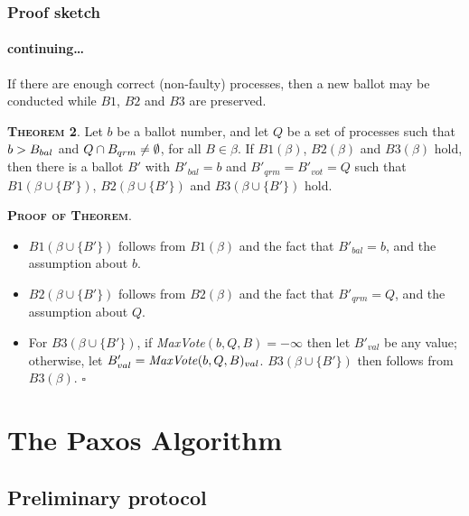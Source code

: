 \documentclass[10 pt]{beamer}
\begin{document}
\begin{frame}
\frametitle{Proof sketch}
\framesubtitle{continuing\ldots}

If there are enough correct (non-faulty) processes, then a new ballot may be conducted while $B1$, $B2$ and $B3$ are preserved.

\vspace{2 mm}
\textbf{\textsc{Theorem 2}}. Let $b$ be a ballot number, and let $Q$ be a set of processes such that $b > B_{bal}$ and $Q \cap B_{qrm} \neq \emptyset$, for all $B \in \beta$. If $B1(\beta)$, $B2(\beta)$ and $B3(\beta)$ hold, then there is a ballot $B'$ with $B'_{bal} = b$ and $B'_{qrm} = B'_{vot} = Q$ such that $B1(\beta \cup \{B'\})$, $B2(\beta \cup \{B'\})$ and $B3(\beta \cup \{B'\})$ hold.

\vspace{2 mm}
\textbf{\textsc{Proof of Theorem}}.
\begin{itemize}
\item $B1(\beta \cup \{B'\})$ follows from $B1(\beta)$ and the fact that $B'_{bal} = b$, and the assumption about $b$.
\item $B2(\beta \cup \{B'\})$ follows from $B2(\beta)$ and the fact that $B'_{qrm} = Q$, and the assumption about $Q$.
\item For $B3(\beta \cup \{B'\})$, if \textit{MaxVote}$(b,Q,B) = -\infty$ then let $B'_{val}$ be any value; otherwise, let $B'_{val} = \text{\textit{MaxVote}}(b,Q,B)_{val}$. $B3(\beta \cup \{B'\})$ then follows from $B3(\beta)$. $\square$
\end{itemize} 
\end{frame}



\section{The Paxos Algorithm}

\subsection{Preliminary protocol}
\end{document}
